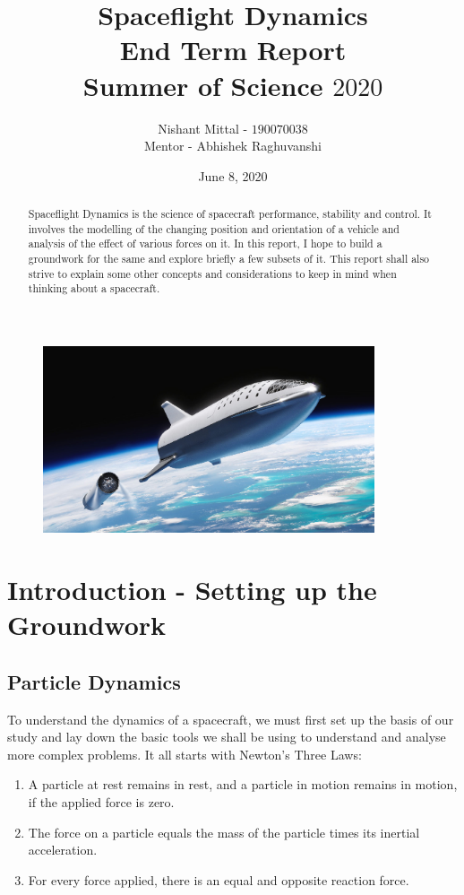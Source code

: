 \documentclass[12pt, letterpaper]{article}
\title{\textbf{Spaceflight Dynamics}\\
		\large{End Term Report}\\
 		\large{Summer of Science $2020$}}
\author{Nishant Mittal - $190070038$\\
Mentor - Abhishek Raghuvanshi}
\date{June 8, 2020}
\begin{document}
\setlength{\parindent}{0pt}
\maketitle

\begin{figure}[h]
	\centering
    \includegraphics[width=370px]{cover}
\end{figure}

\begin{abstract}
Spaceflight Dynamics is the science of spacecraft performance, stability and control. It involves the modelling of the changing position and orientation of a vehicle and analysis of the effect of various forces on it. In this report, I hope to build a groundwork for the same and explore briefly a few subsets of it. This report shall also strive to explain some other concepts and considerations to keep in mind when thinking about a spacecraft.
\end{abstract}

\newpage
\tableofcontents

\newpage
\section{Introduction - Setting up the Groundwork}
\subsection{Particle Dynamics}
To understand the dynamics of a spacecraft, we must first set up the basis of our study and lay down the basic tools we shall be using to understand and analyse more complex problems. It all starts with Newton's Three Laws:
\begin{enumerate}

	\item A particle at rest remains in rest, and a particle in motion remains in motion, if the applied force is zero.
	\item The force on a particle equals the mass of the particle times its inertial acceleration.
	\item For every force applied, there is an equal and opposite reaction force.

\end{enumerate}
\end{document}
